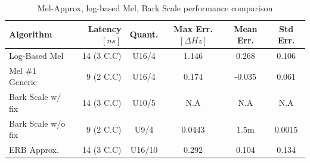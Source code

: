 \begin{table}[H]
    \hspace*{-1.8cm}
\begin{tabular}{ !{\color{mtblborder}\vrule}l!{\color{mtblborder}\vrule}rcccc| } 
    \hline

    \hline
     \color{white}\bf{Algorithm} 
    & \color{white}\bf{Latency \([ns]\)}  
    & \color{white}\bf{Quant.} 
    & \color{white}\bf{Max Err. \([\Delta Hz]\)}
    & \color{white}\bf{Mean Err.}
    & \color{white}\bf{Std Err.} \\
    \hline

    \hline
     Log-Based Mel   & 14 (3 C.C) & U16/4 & 1.146 & 0.268 & 0.106 \\
    \hline
    
    \hline
     Mel \#1 Generic     & 9 (2 C.C) &  U16/4  & 0.174 & -0.035 & 0.061 \\
    \hline
    
    \hline
     Bark Scale w/ fix      & 14 (3 C.C) &  U10/5 & N.A & N.A & N.A \\
    \hline

    \hline
     Bark Scale w/o fix     & 9 (2 C.C) &  U9/4  & 0.0443 & 1.5m & 0.0015 \\
    \hline

    \hline
     ERB Approx.     & 14 (3 C.C) &  U16/10  & 0.292 & 0.104 & 0.134 \\
    \hline

    \hline
\end{tabular}
\caption{Mel-Approx, log-based Mel, Bark Scale performance comparison}
\label{tbl:scale_pwr_tbl}
\end{table}



